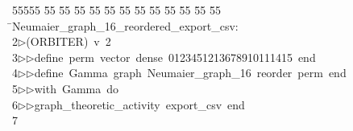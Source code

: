 %
%
\begin{tabbing}
55555 \= 55 \= 55 \= 55 \= 55 \= 55 \= 55 \= 55 \= 55 \= 55 \= 55 \= 55 \= 55 \= \>Neumaier\_graph\_16\_reordered\_export\_csv:\\[0pt]
2\>$\triangleright$\>(ORBITER)\ v\ 2\ \\[0pt]
3\>$\triangleright$\>$\triangleright$\>define\ perm\ vector\ dense\ 0123451213678910111415\ end\ \\[0pt]
4\>$\triangleright$\>$\triangleright$\>define\ Gamma\ graph\ Neumaier\_graph\_16\ reorder\ perm\ end\ \\[0pt]
5\>$\triangleright$\>$\triangleright$\>with\ Gamma\ do\ \\[0pt]
6\>$\triangleright$\>$\triangleright$\>graph\_theoretic\_activity\ export\_csv\ end\\[0pt]
7\>\end{tabbing}
